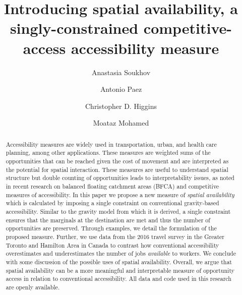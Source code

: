 \documentclass[]{elsarticle} %
\begin{document}
\begin{frontmatter}

  \title{Introducing spatial availability, a singly-constrained
competitive-access accessibility measure}
    \author[SEES]{Anastasia Soukhov}
    \author[SEES]{Antonio Paez}
    \author[UofTS]{Christopher D. Higgins}
    \author[CIVENG]{Moataz Mohamed}
      \address[SEES]{School of Earth, Environment and Society, McMaster
University, Hamilton, ON, L8S 4K1, Canada}
    \address[University of Toronto Scarborough]{Department of Geography
\& Planning, University of Toronto Scarborough, 1265 Military Trail,
Toronto, ON M1C1A4}
    \address[CIVENG]{Dept. of Civil Engineering, McMaster University,
Hamilton, ON, L8S 4K1, Canada}
  
  \begin{abstract}
  Accessibility measures are widely used in transportation, urban, and
  health care planning, among other applications. These measures are
  weighted sums of the opportunities that can be reached given the cost
  of movement and are interpreted as the potential for spatial
  interaction. These measures are useful to understand spatial structure
  but double counting of opportunities leads to interpretability issues,
  as noted in recent research on balanced floating catchment areas
  (BFCA) and competitive measures of accessibility. In this paper we
  propose a new measure of \emph{spatial availability} which is
  calculated by imposing a single constraint on conventional
  gravity-based accessibility. Similar to the gravity model from which
  it is derived, a single constraint ensures that the marginals at the
  destination are met and thus the number of opportunities are
  preserved. Through examples, we detail the formulation of the proposed
  measure. Further, we use data from the 2016 travel survey in the
  Greater Toronto and Hamilton Area in Canada to contrast how
  conventional accessibility overestimates and underestimates the number
  of jobs \emph{available} to workers. We conclude with some discussion
  of the possible uses of spatial availability. Overall, we argue that
  spatial availability can be a more meaningful and interpretable
  measure of opportunity access in relation to conventional
  accessibility. All data and code used in this research are openly
  available.
  \end{abstract}
  
 \end{frontmatter}
\end{document}

